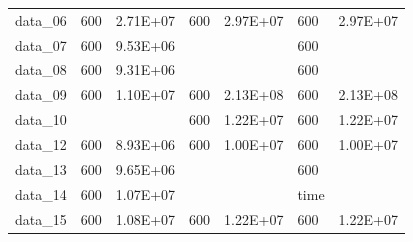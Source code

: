 \begin{table}[]
\begin{tabular}{lllllll}
data\_06 & 600                                     & 2.71E+07                                   & 600                                  & 2.97E+07                                & 600                                     & 2.97E+07                                    \\
data\_07 & 600                                     & 9.53E+06                                   &                                      &                                         & 600                                     &                                             \\
data\_08 & 600                                     & 9.31E+06                                   &                                      &                                         & 600                                     &                                             \\
data\_09 & 600                                     & 1.10E+07                                   & 600                                  & 2.13E+08                                & 600                                     & 2.13E+08                                    \\
data\_10 &                                         &                                            & 600                                  & 1.22E+07                                & 600                                     & 1.22E+07                                    \\
data\_12 & 600                                     & 8.93E+06                                   & 600                                  & 1.00E+07                                & 600                                     & 1.00E+07                                    \\
data\_13 & 600                                     & 9.65E+06                                   &                                      &                                         & 600                                     &                                             \\
data\_14 & 600                                     & 1.07E+07                                   &                                      &                                         & time                                    &                                             \\
data\_15 & 600                                     & 1.08E+07                                   & 600                                  & 1.22E+07                                & 600                                     & 1.22E+07                                    \\

\end{tabular}
\end{table}
